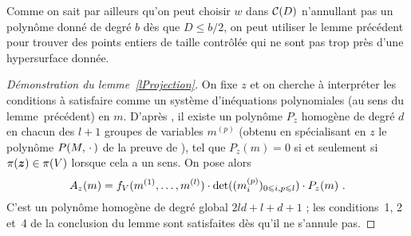 \begin{rem}
  Comme on sait par ailleurs \cite[rem. précédant la prop.~4.1]{remivds} qu'on
  peut choisir \( w \) dans \( \mathcal C(D) \) n'annullant pas un polynôme donné
  de degré \( b \) dès que \( D \le b/2 \), on peut utiliser le lemme
  précédent pour trouver des points entiers de taille contrôlée qui ne sont
  pas \og trop près \fg{} d'une hypersurface donnée.
\end{rem}

\begin{proof}[Démonstration du lemme~\ref{lProjection}]
  On fixe \( z \) et on cherche à interpréter les conditions à satisfaire
  comme un système d'inéquations polynomiales (au sens du lemme~précédent) en
  \( m \).  D'après , il existe un polynôme \( P_z \) homogène de
  degré \( d \) en chacun des \( l+1 \) groupes de variables \( m^{(p)} \)
  (obtenu en spécialisant en \( z \) le polynôme \( P(M, {\,\cdot\,}) \) de la
  preuve de \cite[prop.~6.2]{remdcl}), tel que \( P_z(m) = 0 \) si et
  seulement si \( \pi({\boldsymbol{z}}) \in \pi(V) \) lorsque cela a un sens. On pose
  alors
  \begin{equation}
    A_z(m)
    =
    f_V( m^{(1)}, \dots, m^{(l)} )
    \cdot \det( (m_i^{(p)})_{0 \leqslant i,p \leqslant l} )
    \cdot P_z(m)
    \text{ .}
  \end{equation}
  C'est un polynôme homogène de degré global \( 2ld + l + d + 1 \) ; les
  conditions~1, 2 et~4 de la conclusion du lemme sont satisfaites dès qu'il ne
  s'annule pas.


\end{proof}
